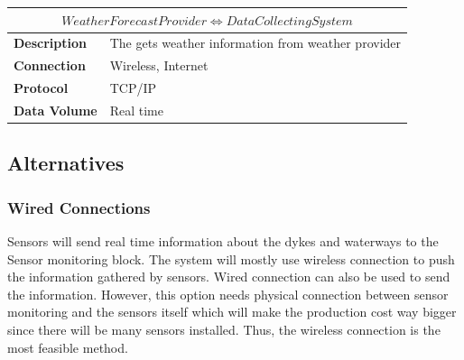 \begin{table}[!htbp]
	\centering
    \begin{tabular}{L{} L{}}
    \toprule
     \\ \midrule
    \textbf{Description} & The \ProjectName{} gets weather information from weather provider \\
    \textbf{Connection} & Wireless, Internet \\
    \textbf{Protocol} & TCP/IP \\
    \textbf{Data Volume} & Real time \\
    \bottomrule
    \end{tabular}
\end{table}

\subsection{Alternatives}

\subsubsection*{Wired Connections}
Sensors will send real time information about the dykes and waterways to the Sensor monitoring block. The system will mostly use wireless connection to push the information gathered by sensors. Wired connection can also be used to send the information. However, this option needs physical connection between sensor monitoring and the sensors itself which will make the production cost way bigger since there will be many sensors installed. Thus, the wireless connection is the most feasible method.
